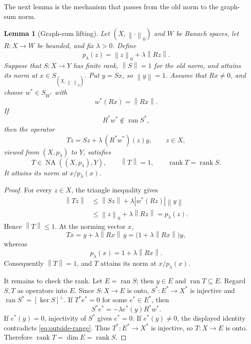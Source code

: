\documentclass[11pt]{article}
\newtheorem{lemma}[theorem]{Lemma}
\theoremstyle{definition}
\newcommand{\NA}{\operatorname{NA}}
\newcommand{\ran}{\operatorname{ran}}
\newcommand{\rank}{\operatorname{rank}}
\newcommand{\norm}[1]{\left\lVert #1\right\rVert}
\newcommand{\abs}[1]{\left\lvert #1\right\rvert}
\begin{document}
The next lemma is the mechanism that passes from the old norm to the graph-sum
norm.

\begin{lemma}[Graph-sum lifting]\label{lem:graph-sum}
Let \((X,\norm{\cdot}_0)\) and \(W\) be Banach spaces, let
\(R:X\to W\) be bounded, and fix \(\lambda>0\).  Define
\[
          p_\lambda(z)=\norm{z}_0+\lambda\norm{Rz}.
\]
Suppose that \(S:X\to Y\) has finite rank, \(\norm{S}=1\) for the old norm,
and attains its norm at \(x\in S_{(X,\norm{\cdot}_0)}\).  Put \(y=Sx\), so
\(\norm{y}=1\).  Assume that \(Rx\neq0\), and choose
\(w^*\in S_{W^*}\) with
\[
                 w^*(Rx)=\norm{Rx}.
\]
If
\begin{equation}\label{eq:outside-range}
                 R^*w^*\notin\ran S^*,
\end{equation}
then the operator
\begin{equation}\label{eq:T-general}
        Tz=Sz+\lambda\,(R^*w^*)(z)y,
        \qquad z\in X,
\end{equation}
viewed from \((X,p_\lambda)\) to \(Y\), satisfies
\[
          T\in\NA((X,p_\lambda),Y),
          \qquad \norm{T}=1,
          \qquad \rank T=\rank S.
\]
It attains its norm at \(x/p_\lambda(x)\).
\end{lemma}

\begin{proof}
For every \(z\in X\), the triangle inequality gives
\begin{align*}
 \norm{Tz}
 &\leq \norm{Sz}+\lambda\abs{w^*(Rz)}\norm{y}\\
 &\leq \norm{z}_0+\lambda\norm{Rz}
  =p_\lambda(z).
\end{align*}
Hence \(\norm{T}\leq1\).  At the norming vector \(x\),
\[
     Tx=y+\lambda\norm{Rx}\,y
       =\bigl(1+\lambda\norm{Rx}\bigr)y,
\]
whereas
\[
     p_\lambda(x)=1+\lambda\norm{Rx}.
\]
Consequently \(\norm{T}=1\), and \(T\) attains its norm at
\(x/p_\lambda(x)\).

It remains to check the rank.  Let \(E=\ran S\); then \(y\in E\) and
\(\ran T\subseteq E\).  Regard \(S,T\) as operators into \(E\).  Since
\(S:X\to E\) is onto, \(S^*:E^*\to X^*\) is injective and
\(\ran S^*= [\ker S]^\perp\).  If \(T^*e^*=0\) for some \(e^*\in E^*\),
then
\[
       S^*e^*=-\lambda e^*(y)R^*w^*.
\]
If \(e^*(y)=0\), injectivity of \(S^*\) gives \(e^*=0\).  If
\(e^*(y)\neq0\), the displayed identity contradicts
\eqref{eq:outside-range}.  Thus \(T^*:E^*\to X^*\) is injective, so
\(T:X\to E\) is onto.  Therefore \(\rank T=\dim E=\rank S\).
\end{proof}
\end{document}

